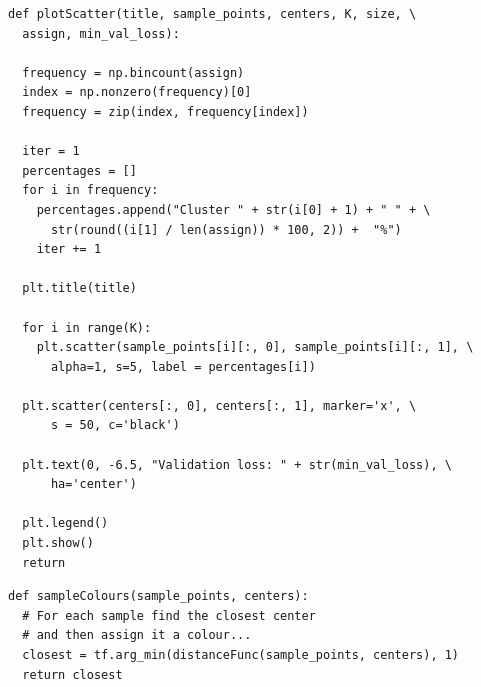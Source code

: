 \documentclass[12pt]{article}
\begin{document}
\begin{verbatim}
def plotScatter(title, sample_points, centers, K, size, \
  assign, min_val_loss):
  
  frequency = np.bincount(assign)
  index = np.nonzero(frequency)[0]
  frequency = zip(index, frequency[index])

  iter = 1
  percentages = []
  for i in frequency:
    percentages.append("Cluster " + str(i[0] + 1) + " " + \
      str(round((i[1] / len(assign)) * 100, 2)) +  "%")
    iter += 1

  plt.title(title)
  
  for i in range(K):
    plt.scatter(sample_points[i][:, 0], sample_points[i][:, 1], \
      alpha=1, s=5, label = percentages[i])

  plt.scatter(centers[:, 0], centers[:, 1], marker='x', \
      s = 50, c='black')

  plt.text(0, -6.5, "Validation loss: " + str(min_val_loss), \
      ha='center')

  plt.legend()
  plt.show()
  return
\end{verbatim}

\begin{verbatim}
def sampleColours(sample_points, centers):
  # For each sample find the closest center 
  # and then assign it a colour...
  closest = tf.arg_min(distanceFunc(sample_points, centers), 1)
  return closest
\end{verbatim}
\end{document}
